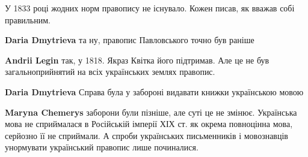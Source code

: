 \begin{itemize}
 
У 1833 році жодних норм правопису не існувало. Кожен писав, як вважав собі правильним.

\begin{itemize}
 
\textbf{Daria Dmytrieva} та ну, правопис Павловського точно був раніше


\begin{itemize}
 
\textbf{Andrii Legin} так, у 1818. Якраз Квітка його підтримав. Але це не був загальноприйнятий на всіх українських землях правопис.
\end{itemize}

 
\textbf{Daria Dmytrieva} Справа була у забороні видавати книжки українською мовою

\begin{itemize}
 
\textbf{Maryna Chemerys} заборони були пізніше, але суті це не змінює.
Українська мова не сприймалася в Російській імперії ХІХ ст. як окрема
повноцінна мова, серйозно її не сприймали. А спроби українських письменників і
мовознавців унормувати український правопис лише починалися.


 

\end{itemize}
\end{itemize}
\end{itemize}
